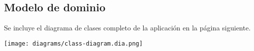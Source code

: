 \subsection{Modelo de dominio}

Se incluye el diagrama de clases completo de la aplicación en la página siguiente.

\clearpage

\begin{sidewaysfigure}
    \texttt{[image: diagrams/class-diagram.dia.png]}
\end{sidewaysfigure}

\clearpage
